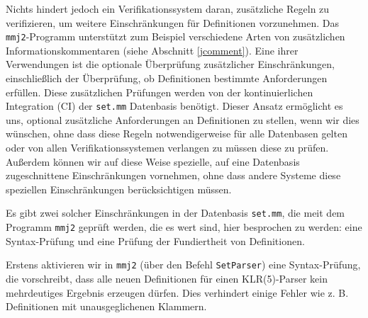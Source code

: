 Nichts hindert jedoch ein Verifikationssystem daran, zusätzliche Regeln zu verifizieren, um weitere Einschränkungen für Definitionen vorzunehmen. Das \texttt{mmj2}-Programm unterstützt zum Beispiel verschiedene Arten von zusätzlichen Informationskommentaren (siehe Abschnitt \ref{jcomment}). Eine ihrer Verwendungen ist die optionale Überprüfung zusätzlicher Einschränkungen, einschließlich der Überprüfung, ob Definitionen bestimmte Anforderungen erfüllen. Diese zusätzlichen Prüfungen werden von der kontinuierlichen Integration (CI) der \texttt{set.mm} Datenbasis benötigt. Dieser Ansatz ermöglicht es uns, optional zusätzliche Anforderungen an Definitionen zu stellen, wenn wir dies wünschen, ohne dass diese Regeln notwendigerweise für alle Datenbasen gelten oder von allen Verifikationssystemen verlangen zu müssen diese zu prüfen. Außerdem können wir auf diese Weise spezielle, auf eine Datenbasis zugeschnittene Einschränkungen vornehmen, ohne dass andere Systeme diese speziellen Einschränkungen berücksichtigen müssen. 

Es gibt zwei solcher Einschränkungen in der Datenbasis \texttt{set.mm}, die meit dem Programm \texttt{mmj2} geprüft werden, die es wert sind, hier besprochen zu werden: eine Syntax-Prüfung und eine Prüfung der Fundiertheit von Definitionen.

%

Erstens aktivieren wir in \texttt{mmj2} (über den Befehl \texttt{SetParser}) eine Syntax-Prüfung, die vorschreibt, dass alle neuen Definitionen für einen KLR(5)-Parser kein mehrdeutiges Ergebnis erzeugen dürfen. Dies verhindert einige Fehler wie z. B. Definitionen mit unausgeglichenen Klammern. 

